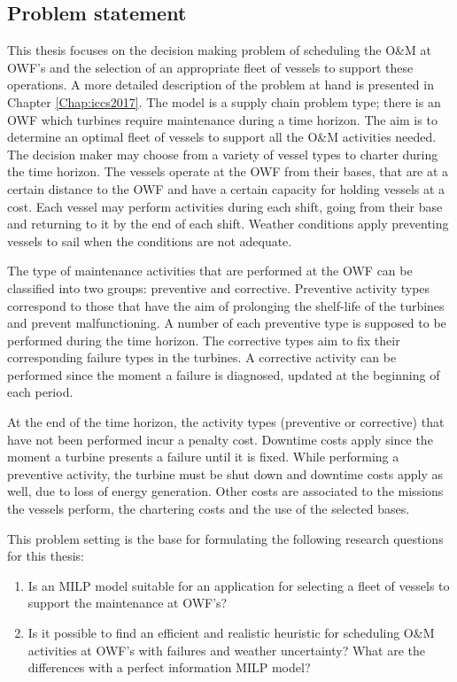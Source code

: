 \subsection{Problem statement}
\label{subsec:statementOWF}
This thesis focuses on the decision making problem of scheduling the O\&M at OWF's and the selection of an appropriate fleet of vessels to support these operations. A more detailed description of the problem at hand is presented in Chapter \ref{Chap:iccs2017}. The model is a supply chain problem type; there is an OWF which turbines require maintenance during a time horizon. The aim is to determine an optimal fleet of vessels to support all the O\&M activities needed. The decision maker may choose from a variety of vessel types to charter during the time horizon. The vessels operate at the OWF from their bases, that are at a certain distance to the OWF and have a certain capacity for holding vessels at a cost. Each vessel may perform activities during each shift, going from their base and returning to it by the end of each shift. Weather conditions apply preventing vessels to sail when the conditions are not adequate.

The type of maintenance activities that are performed at the OWF can be classified into two groups: preventive and corrective. Preventive activity types correspond to those that have the aim of prolonging the shelf-life of the turbines and prevent malfunctioning. A number of each preventive type is supposed to be performed during the time horizon. The corrective types aim to fix their corresponding failure types in the turbines. A corrective activity can be performed since the moment a failure is diagnosed, updated at the beginning of each period.

At the end of the time horizon, the activity types (preventive or corrective) that have not been performed incur a penalty cost. Downtime costs apply since the moment a turbine presents a failure until it is fixed. While performing a preventive activity, the turbine must be shut down and downtime costs apply as well, due to loss of energy generation. Other costs are associated to the missions the vessels perform, the chartering costs and the use of the selected bases.

This problem setting is the base for formulating the following research questions for this thesis:

\begin{enumerate}
	\item Is an MILP model suitable for an application for selecting a fleet of vessels to support the maintenance at OWF's?
	\item Is it possible to find an efficient and realistic heuristic for scheduling O\&M activities at OWF's with failures and weather uncertainty? What are the differences with a perfect information MILP model?
\end{enumerate}



